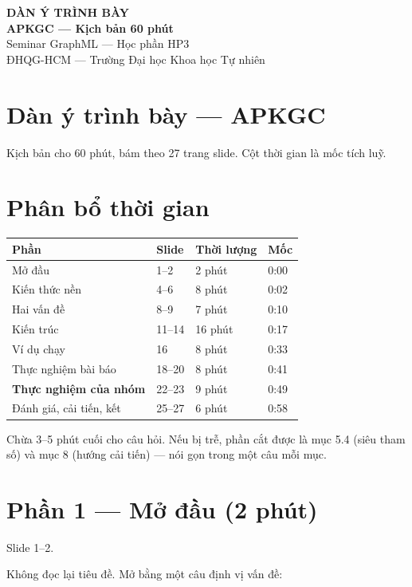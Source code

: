 \documentclass[11pt,a4paper]{article}
\begin{document}
\begin{center}
  {\sffamily\LARGE\bfseries\color{hcmusblue} DÀN Ý TRÌNH BÀY}\\[8pt]
  {\sffamily\large\bfseries APKGC --- Kịch bản 60 phút}\\[10pt]
  {\small Seminar GraphML --- Học phần HP3}\\[2pt]
  {\small ĐHQG-HCM --- Trường Đại học Khoa học Tự nhiên}
\end{center}

\vspace{6pt}
\section{Dàn ý trình bày --- APKGC}
Kịch bản cho 60 phút, bám theo 27 trang slide. Cột thời gian là mốc tích luỹ.

\section{Phân bổ thời gian}
\begin{center}\small
\begin{tabular}{@{}llll@{}}
\toprule
\textbf{Phần} & \textbf{Slide} & \textbf{Thời lượng} & \textbf{Mốc}\\
\midrule
Mở đầu & 1--2 & 2 phút & 0:00\\
Kiến thức nền & 4--6 & 8 phút & 0:02\\
Hai vấn đề & 8--9 & 7 phút & 0:10\\
Kiến trúc & 11--14 & 16 phút & 0:17\\
Ví dụ chạy & 16 & 8 phút & 0:33\\
Thực nghiệm bài báo & 18--20 & 8 phút & 0:41\\
\textbf{Thực nghiệm của nhóm} & 22--23 & 9 phút & 0:49\\
Đánh giá, cải tiến, kết & 25--27 & 6 phút & 0:58\\
\bottomrule
\end{tabular}
\end{center}
Chừa 3--5 phút cuối cho câu hỏi. Nếu bị trễ, phần cắt được là mục 5.4 (siêu tham số) và mục 8 (hướng cải tiến) --- nói gọn trong một câu mỗi mục.

\section{Phần 1 --- Mở đầu (2 phút)}
Slide 1--2.

Không đọc lại tiêu đề. Mở bằng một câu định vị vấn đề:
\end{document}
